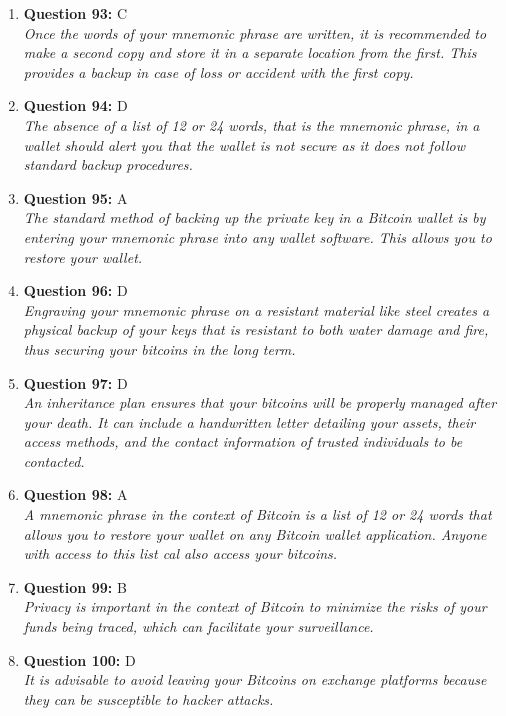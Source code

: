 \documentclass[12pt,a4paper]{article}
\begin{document}
\begin{enumerate}
\item \textbf{Question 93:} C
\\ \textit{Once the words of your mnemonic phrase are written, it is recommended to make a second copy and store it in a separate location from the first. This provides a backup in case of loss or accident with the first copy.}

\item \textbf{Question 94:} D
\\ \textit{The absence of a list of 12 or 24 words, that is the mnemonic phrase, in a wallet should alert you that the wallet is not secure as it does not follow standard backup procedures.}

\item \textbf{Question 95:} A
\\ \textit{The standard method of backing up the private key in a Bitcoin wallet is by entering your mnemonic phrase into any wallet software. This allows you to restore your wallet.}

\item \textbf{Question 96:} D
\\ \textit{Engraving your mnemonic phrase on a resistant material like steel creates a physical backup of your keys that is resistant to both water damage and fire, thus securing your bitcoins in the long term.}

\item \textbf{Question 97:} D
\\ \textit{An inheritance plan ensures that your bitcoins will be properly managed after your death. It can include a handwritten letter detailing your assets, their access methods, and the contact information of trusted individuals to be contacted.}

\item \textbf{Question 98:} A
\\ \textit{A mnemonic phrase in the context of Bitcoin is a list of 12 or 24 words that allows you to restore your wallet on any Bitcoin wallet application. Anyone with access to this list cal also access your bitcoins.}

\item \textbf{Question 99:} B
\\ \textit{Privacy is important in the context of Bitcoin to minimize the risks of your funds being traced, which can facilitate your surveillance.}

\item \textbf{Question 100:} D
\\ \textit{It is advisable to avoid leaving your Bitcoins on exchange platforms because they can be susceptible to hacker attacks.}


\end{enumerate}
\end{document}
